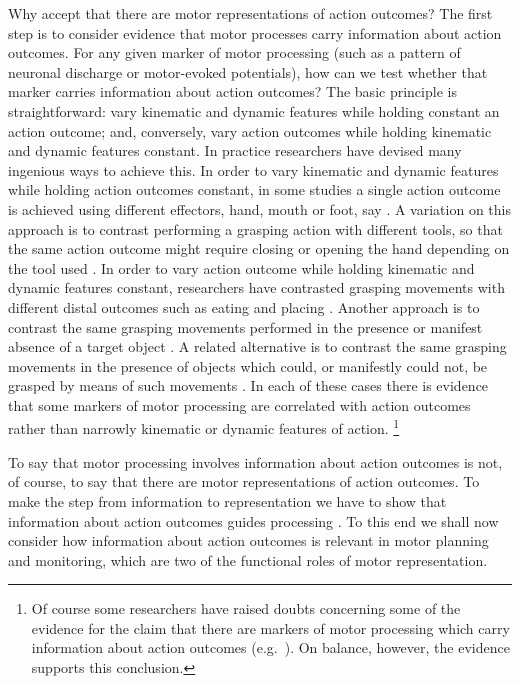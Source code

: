 \documentclass[12pt,\papersize]{extarticle}
\begin{document}
Why accept that there are motor representations of action outcomes? The first step is to consider evidence that motor processes carry information about action outcomes. For any given marker of motor processing (such as a pattern of neuronal discharge or motor-evoked potentials), how can we test whether that marker carries information about action outcomes? The basic principle is straightforward: vary kinematic and dynamic features while holding constant an action outcome; and, conversely, vary action outcomes while holding kinematic and dynamic features constant. In practice researchers have devised many ingenious ways to achieve this. In order to vary kinematic and dynamic features while holding action outcomes constant, in some studies a single action outcome is achieved using different effectors, hand, mouth or foot, say \citep{rizzolatti:1988_functional,Rizzolatti:2001ug,cattaneo:2010_state-dependent}. A variation on this approach is to contrast performing a grasping action with different tools, so that the same action outcome might require closing or opening the hand depending on the tool used \citep{umilta:2008pliers,cattaneo:2009_representation,rochat:2010_responses}. In order to vary action outcome while holding kinematic and dynamic features constant, researchers have contrasted grasping movements with different distal outcomes such as eating and placing \citep{Fogassi:2005nf,bonini:2010_ventral,cattaneo:2007_impairment}. Another approach is to contrast the same grasping movements performed in the presence or manifest absence of a target object \citep{Umilta:2001zr,villiger:2010_activity}. A related alternative is to contrast the same grasping movements in the presence of objects which could, or manifestly could not, be grasped by means of such movements \citep{koch:2010_resonance}. 
In each of these cases there is evidence that some markers of motor processing are correlated with action outcomes rather than narrowly kinematic or dynamic features of action.%
\footnote{ Of course some researchers have raised doubts concerning some of the evidence for the claim that there are markers of motor processing which carry information about action outcomes (e.g.\ \citealp{cavallo_grasping_2011,borroni_mirroring_2011}).  On balance, however, the evidence supports this conclusion.}

To say that motor processing involves information about action outcomes is not, of course, to say that there are motor representations of action outcomes.  To make the step from information to representation we have to show that information about action outcomes guides processing \citep[compare][]{Dretske:1988sq}. To this end we shall now consider how information about action outcomes is relevant in motor planning and monitoring, which are two of the functional roles of motor representation.  
\end{document}
